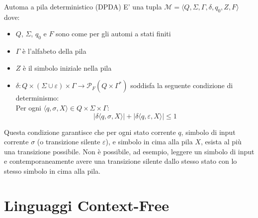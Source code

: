 \documentclass[12pt, a4paper]{report}
\begin{document}
            \begin{definitionbox}{Automa a pila deterministico (DPDA)}{}
                 E' una tupla $\mathcal{M} = \langle Q, \Sigma, \Gamma, \delta, q_0, Z, F \rangle$ dove: \begin{itemize}
                    \item $Q$, $\Sigma$, $q_0$ e $F$ sono come per gli automi a stati finiti
                    \item $\Gamma$ è l'alfabeto della pila
                    \item $Z$ è il simbolo iniziale nella pila
                    \item $\delta : Q \times (\Sigma \cup {\varepsilon}) \times \Gamma \to \mathcal{P}_F(Q \times \Gamma^*)$ soddisfa la seguente condizione di determinismo:
                    \\Per ogni $\langle q, \sigma, X \rangle \in Q \times \Sigma \times \Gamma$: $$|\delta\langle q, \sigma, X \rangle| + |\delta\langle q, \varepsilon, X \rangle| \le 1$$
                 \end{itemize}
                 Questa condizione garantisce che per ogni stato corrente $q$, simbolo di input corrente $\sigma$ (o transizione silente $\varepsilon$), e simbolo in cima alla pila $X$, esista al più una transizione possibile. Non è possibile, ad esempio, leggere un simbolo di input e contemporaneamente avere una transizione silente dallo stesso stato con lo stesso simbolo in cima alla pila.
            \end{definitionbox}
        \section{Linguaggi Context-Free}
\end{document}

